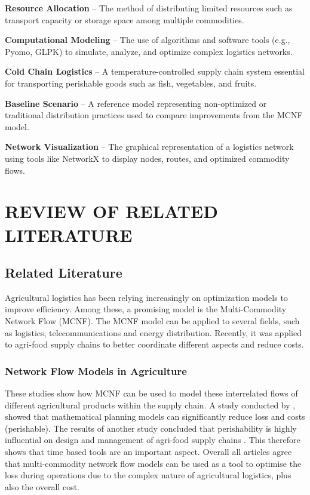 \documentclass{icsthesis}
\begin{document}
\begin{mainmatter}
\textbf{Resource Allocation} – The method of distributing limited resources such as transport capacity or storage space among multiple commodities.

\textbf{Computational Modeling} – The use of algorithms and software tools (e.g., Pyomo, GLPK) to simulate, analyze, and optimize complex logistics networks.

\textbf{Cold Chain Logistics} – A temperature-controlled supply chain system essential for transporting perishable goods such as fish, vegetables, and fruits.

\textbf{Baseline Scenario} – A reference model representing non-optimized or traditional distribution practices used to compare improvements from the MCNF model.

\textbf{Network Visualization} – The graphical representation of a logistics network using tools like NetworkX to display nodes, routes, and optimized commodity flows.


\section{REVIEW OF RELATED LITERATURE}


\subsection{Related Literature}
Agricultural logistics has been relying increasingly on optimization models to improve efficiency. Among these, a promising model is the Multi-Commodity Network Flow (MCNF). The MCNF model can be applied to several fields, such as logistics, telecommunications and energy distribution. Recently, it was applied to agri-food supply chains to better coordinate different aspects and reduce costs.


\subsubsection{Network Flow Models in Agriculture}
These studies show how MCNF can be used to model these interrelated flows of different agricultural products within the supply chain. A study conducted by \citet{ahumada2009}, showed that mathematical planning models can significantly reduce loss and costs (perishable). The results of another study concluded that perishability is highly influential on design and management of agri-food supply chains \citep{esteso2021}. This therefore shows that time based tools are an important aspect. Overall all articles agree that multi-commodity network flow models can be used as a tool to optimise the loss during operations due to the complex nature of agricultural logistics, plus also the overall cost.



\end{mainmatter}
\end{document}
